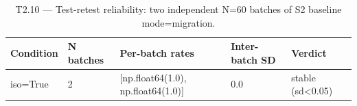\begin{table}[t]
\centering
\caption{T2.10 — Test-retest reliability: two independent N=60 batches of S2 baseline mode=migration.}
\label{tab:T2_10_test_retest}
\begin{tabular}{lllll}
\hline
Condition & N batches & Per-batch rates & Inter-batch SD & Verdict \\
\hline
iso=True & 2 & [np.float64(1.0), np.float64(1.0)] & 0.0 & stable (sd<0.05) \\
\hline
\end{tabular}
\end{table}
